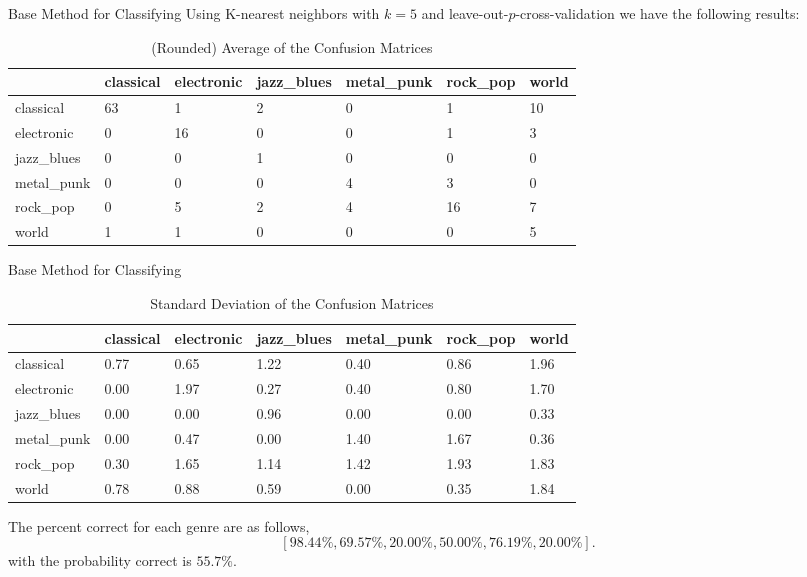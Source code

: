\documentclass[xcolor=dvipsnames,t]{beamer} %
\begin{document}
\begin{frame}[shrink=20]{Base Method for Classifying}
Using K-nearest neighbors with $k=5$ and leave-out-$p$-cross-validation we have the following results:
\begin{table}[h!]
\centering
%
 \begin{tabular}{ l||l | l | l | l | l | l | }
 & classical & electronic & jazz\_blues & metal\_punk & rock\_pop & world\\\hline
classical & 63 &1 &2 &0 &1 &10 \\ \hline 
electronic & 0 &16 &0 &0 &1 &3 \\ \hline 
jazz\_blues & 0 &0 &1 &0 &0 &0 \\ \hline 
metal\_punk & 0 &0 &0 &4 &3 &0 \\ \hline 
rock\_pop & 0 &5 &2 &4 &16 &7 \\ \hline 
world & 1 &1 &0 &0 &0 &5 \\ \hline 
\end{tabular}

\caption{(Rounded) Average of the Confusion Matrices}
\label{fig:avgconfMat}
\end{table}
\end{frame}

\begin{frame}[shrink=20]{Base Method for Classifying}
\begin{table}[h!]
\centering
%
 \begin{tabular}{ l||l | l | l | l | l | l | }
 & classical & electronic & jazz\_blues & metal\_punk & rock\_pop & world\\\hline
classical & 0.77 &0.65 &1.22 &0.40 &0.86 &1.96 \\ \hline 
electronic & 0.00 &1.97 &0.27 &0.40 &0.80 &1.70 \\ \hline 
jazz\_blues & 0.00 &0.00 &0.96 &0.00 &0.00 &0.33 \\ \hline 
metal\_punk & 0.00 &0.47 &0.00 &1.40 &1.67 &0.36 \\ \hline 
rock\_pop & 0.30 &1.65 &1.14 &1.42 &1.93 &1.83 \\ \hline 
world & 0.78 &0.88 &0.59 &0.00 &0.35 &1.84 \\ \hline 
\end{tabular}

\caption{Standard Deviation of the Confusion Matrices}
\label{fig:stdconfMat}
\end{table}
The percent correct for each genre are as follows,
   \[ [98.44\%, 69.57\%,20.00\%,50.00\%,76.19\%,20.00\%]. \]
 with the probability correct is $55.7\%$.
\end{frame}
\end{document}

